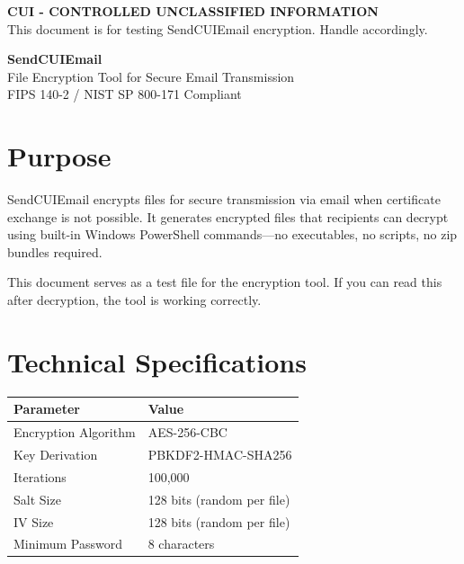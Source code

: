 \documentclass[11pt,letterpaper]{article}
\begin{document}
\begin{center}
\colorbox{yellow!30}{\parbox{0.95\textwidth}{\centering\textbf{CUI - CONTROLLED UNCLASSIFIED INFORMATION}\\
\small This document is for testing SendCUIEmail encryption. Handle accordingly.}}
\end{center}

\vspace{0.25in}

\begin{center}
\LARGE\textbf{SendCUIEmail}\\[6pt]
\large File Encryption Tool for Secure Email Transmission\\[12pt]
\normalsize FIPS 140-2 / NIST SP 800-171 Compliant
\end{center}

\vspace{0.25in}

\section*{Purpose}

SendCUIEmail encrypts files for secure transmission via email when certificate exchange is not possible. It generates encrypted files that recipients can decrypt using built-in Windows PowerShell commands---no executables, no scripts, no zip bundles required.

This document serves as a test file for the encryption tool. If you can read this after decryption, the tool is working correctly.

\section*{Technical Specifications}

\begin{tabularx}{\textwidth}{|l|X|}
\hline
\textbf{Parameter} & \textbf{Value} \\
\hline
Encryption Algorithm & AES-256-CBC \\
\hline
Key Derivation & PBKDF2-HMAC-SHA256 \\
\hline
Iterations & 100,000 \\
\hline
Salt Size & 128 bits (random per file) \\
\hline
IV Size & 128 bits (random per file) \\
\hline
Minimum Password & 8 characters \\
\hline
\end{tabularx}
\end{document}
